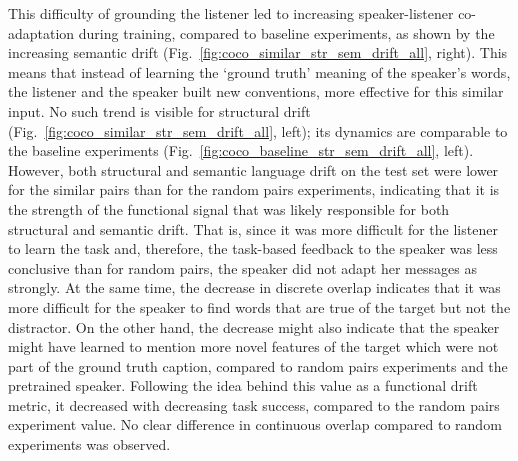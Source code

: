 This difficulty of grounding the listener led to increasing speaker-listener co-adaptation during training, compared to baseline experiments, as shown by the increasing semantic drift (Fig.~\ref{fig:coco_similar_str_sem_drift_all}, right). This means that instead of learning the `ground truth' meaning of the speaker's words, the listener and the speaker built new conventions, more effective for this similar input. No such trend is visible for structural drift (Fig.~\ref{fig:coco_similar_str_sem_drift_all}, left); its dynamics are comparable to the baseline experiments (Fig.~\ref{fig:coco_baseline_str_sem_drift_all}, left). 
However, both structural and semantic language drift on the test set were lower for the similar pairs than for the random pairs experiments, indicating that it is the strength of the functional signal that was likely responsible for both structural and semantic drift. That is, since it was more difficult for the listener to learn the task and, therefore, the task-based feedback to the speaker was less conclusive than for random pairs, the speaker did not adapt her messages as strongly.
At the same time, the decrease in discrete overlap indicates that it was more difficult for the speaker to find words that are true of the target but not the distractor. On the other hand, the decrease might also indicate that the speaker might have learned to mention more novel features of the target which were not part of the ground truth caption, compared to random pairs experiments and the pretrained speaker. Following the idea behind this value as a functional drift metric, it decreased with decreasing task success, compared to the random pairs experiment value. No clear difference in continuous overlap compared to random experiments was observed.

